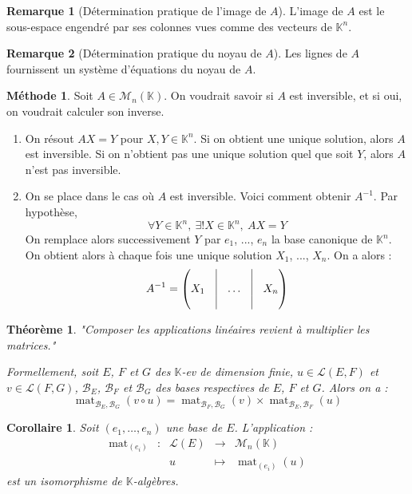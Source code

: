\documentclass[french]{book}
\newcommand{\K}{\mathbb{K}}
\newcommand{\inv}{^{-1}}
\theoremstyle{plain}
\newtheorem{thm}{Théorème}[chapter]
\newtheorem{cor}{Corollaire}[chapter]
\theoremstyle{definition}
\newtheorem{rmq}{Remarque}[chapter]
\newtheorem{met}{Méthode}[chapter]
\theoremstyle{remark}
\DeclareMathOperator{\mat}{mat}
\begin{document}
\begin{rmq}[Détermination pratique de l'image de $A$]
	L'image de $A$ est le sous-espace engendré par ses colonnes vues comme des vecteurs de $\K^n$.
\end{rmq}
\begin{rmq}[Détermination pratique du noyau de $A$]
	Les lignes de $A$ fournissent un système d'équations du noyau de $A$.
\end{rmq}
\begin{met}
	Soit $A\in\mathcal{M}_n(\K)$. On voudrait savoir si $A$ est inversible, et si oui, on voudrait calculer son inverse. \begin{enumerate}
		\item On résout $AX=Y$ pour $X,Y\in\K^n$. Si on obtient une unique solution, alors $A$ est inversible. Si on n'obtient pas une unique solution quel que soit $Y$, alors $A$ n'est pas inversible.
		\item On se place dans le cas où $A$ est inversible. Voici comment obtenir $A\inv$. Par hypothèse, $$\forall Y\in\K^n,\ \exists!X\in\K^n,\ AX=Y$$ On remplace alors successivement $Y$ par $e_1$, ..., $e_n$ la base canonique de $\K^n$. On obtient alors à chaque fois une unique solution $X_1$, ..., $X_n$. On a alors : $$A\inv=\begin{pmatrix}&\vline&&\vline&\\X_1&\vline&\ldots&\vline&X_n\\&\vline&&\vline&\end{pmatrix}$$
	\end{enumerate}
\end{met}
\begin{thm}
	"Composer les applications linéaires revient à multiplier les matrices." \par Formellement, soit $E$, $F$ et $G$ des $\K$-ev de dimension finie, $u\in\mathcal{L}(E,F)$ et $v\in\mathcal{L}(F,G)$, $\mathcal{B}_E$, $\mathcal{B}_F$ et $\mathcal{B}_G$ des bases respectives de $E$, $F$ et $G$. Alors on a : $$\mat_{\mathcal{B}_E,\mathcal{B}_G}(v\circ u)=\mat_{\mathcal{B}_F,\mathcal{B}_G}(v)\times\mat_{\mathcal{B}_E,\mathcal{B}_F}(u)$$
\end{thm}
\begin{cor}
	Soit $(e_1,\ldots,e_n)$ une base de $E$. L'application : $$\begin{array}{ccccc}\mat_{(e_i)}&:&\mathcal{L}(E)&\rightarrow&\mathcal{M}_n(\K)\\&&u&\mapsto&\mat_{(e_i)}(u)\end{array}$$ est un isomorphisme de $\K$-algèbres.
\end{cor}
\end{document}
